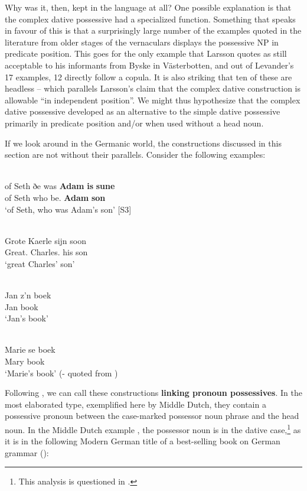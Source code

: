 Why was it, then, kept in the language at all? One possible explanation is that the complex dative possessive had a specialized function. Something that speaks in favour of this is that a surprisingly large number of the examples quoted in the literature from older stages of the vernaculars displays the possessive NP in predicate position. This goes for the only example that Larsson quotes as still acceptable to his informants from Byske in Västerbotten, and out of Levander’s 17 examples, 12 directly follow a copula. It is also striking that ten of these are headless – which parallels Larsson’s claim that the complex dative construction is allowable “in independent position”. We might thus hypothesize that the complex dative possessive developed as an alternative to the simple dative possessive primarily in predicate position and/or when used without a head noun. 

If we look around in the Germanic world, the constructions discussed in this section are not without their parallels. Consider the following examples: 

\ea%
\\
\gll of  Seth  ðe  was  \textbf{Adam} \textbf{is} \textbf{sune}\\
of  Seth  who  be.{\pst}  \textbf{Adam} \textbf{{\poss}} \textbf{son}\\
\glt ‘of Seth, who was Adam’s son’ [S3]
\z

\ea%
\\
\gll Grote  Kaerle  sijn  soon\\
Great.{\dat}  Charles.{\dat}  his  son\\
\glt ‘great Charles’ son’
\z

\ea%
\\
\gll Jan  z’n  boek\\
Jan  {\poss}   book\\
\glt ‘Jan’s book’
\z

\ea%
\\
\gll Marie  se  boek\\
Mary  {\poss}  book\\
\glt ‘Marie’s book’ (- quoted from \citealt[56]{Norde1997})
\z

Following \citet{KoptjevskajaTamm2003}, we can call these constructions \textbf{linking pronoun possessives}. In the most elaborated type, exemplified here by Middle Dutch, they contain a possessive pronoun between the case-marked possessor noun phrase and the head noun. In the Middle Dutch example , the possessor noun is in the dative case,\footnote{ This analysis is questioned in \citet{Allen2008}.} as it is in the following Modern German title of a best-selling book on German grammar (\citealt{Sick2004}):

